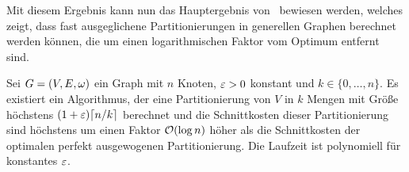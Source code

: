Mit diesem Ergebnis kann nun das Hauptergebnis von~\parencite{ff13} bewiesen werden, welches zeigt, dass fast ausgeglichene Partitionierungen in generellen Graphen berechnet werden können, die um einen logarithmischen Faktor vom Optimum entfernt sind.\\

\begin{thm}
    Sei $G = (V, E, \omega)$ ein Graph mit $n$ Knoten, $\varepsilon > 0$ konstant und $k \in \{0, \ldots, n\}$. Es existiert ein Algorithmus, der eine Partitionierung von $V$ in $k$ Mengen mit Größe höchstens $(1 + \eps) \ceil*{n/k}$ berechnet und die Schnittkosten dieser Partitionierung sind höchstens um einen Faktor $\mathcal{O}(\log n)$ höher als die Schnittkosten der optimalen perfekt ausgewogenen Partitionierung.
    Die Laufzeit ist polynomiell für konstantes $\varepsilon$.
\end{thm}
